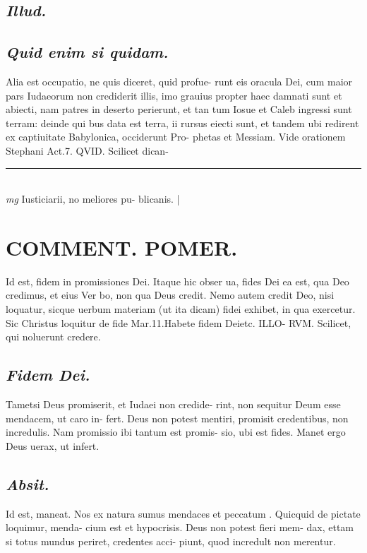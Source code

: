 \documentclass{article}
\begin{document}
\begin{pages}
\subsection*{\textit{Illud. }}
{}
\subsection*{\textit{Quid enim si quidam. }}\pstart Alia est occupatio, ne quis diceret, quid profue- runt eis oracula Dei, cum maior pars Iudaeorum non crediderit illis, imo grauius propter haec damnati sunt et abiecti, nam patres in deserto perierunt, et tan tum Iosue et Caleb ingressi sunt terram: deinde qui bus data est terra, ii rursus eiecti sunt, et tandem ubi redirent ex captiuitate Babylonica, occiderunt Pro- phetas et Messiam. Vide orationem Stephani Act.7.  QVID. Scilicet dican-  \pend
\vspace{0.5cm}\noindent
\vspace{0.2cm}\rule{1cm}{0.2pt}\\ 
\hspace{0.2cm}\textit{mg}
\footnotesize Iusticiarii, no meliores pu- blicanis. 
\normalsize| 
\section*{COMMENT. POMER.  }\pstart Id est, fidem in promissiones Dei. Itaque hic obser ua, fides Dei ea est, qua Deo credimus, et eius Ver bo, non qua Deus credit. Nemo autem credit Deo, nisi loquatur, sicque uerbum materiam (ut ita dicam) fidei exhibet, in qua exercetur. Sic Christus loquitur de fide Mar.11.Habete fidem Deietc. ILLO- RVM. Scilicet, qui noluerunt credere.  \pend
{}
{}
\subsection*{\textit{Fidem Dei. }}\pstart Tametsi Deus promiserit, et Iudaei non credide- rint, non sequitur Deum esse mendacem, ut caro in- fert. Deus non potest mentiri, promisit credentibus, non incredulis. Nam promissio ibi tantum est promis- sio, ubi est fides. Manet ergo Deus uerax, ut infert.   \pend
{}
{}
\subsection*{\textit{Absit. }}\pstart Id est, maneat. Nos ex natura sumus mendaces et peccatum . Quicquid de pictate loquimur, menda- cium est et hypocrisis. Deus non potest fieri mem- dax, ettam si totus mundus periret, credentes acci- piunt, quod incredult non merentur.   \pend
{}
{}

\end{pages}
\end{document}
